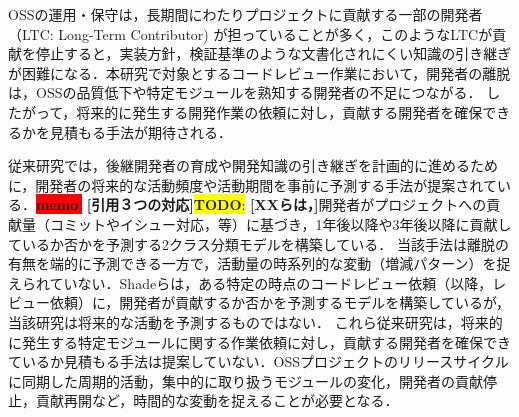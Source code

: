\documentclass[submit,noauthor,ses,dvipdfmx]{ipsj}
\newcommand{\todo}[1]{\colorbox{yellow}{{\bf TODO}:}{\color{red} {\textbf{[#1]}}}}
\newcommand{\memo}[1]{\colorbox{red}{{\bf memo}:}{\color{blue} {\textbf{[#1]}}}}
\begin{document}
OSSの運用・保守は，長期間にわたりプロジェクトに貢献する一部の開発者（LTC: Long-Term Contributor) が担っていることが多く，このようなLTCが貢献を停止すると，実装方針，検証基準のような文書化されにくい知識の引き継ぎが困難になる．本研究で対象とするコードレビュー作業において，開発者の離脱は，OSSの品質低下や特定モジュールを熟知する開発者の不足につながる\cite{bacchelli}\cite{mcintosh}．
したがって，将来的に発生する開発作業の依頼に対し，貢献する開発者を確保できるかを見積もる手法が期待される．

従来研究では，後継開発者の育成や開発知識の引き継ぎを計画的に進めるために，開発者の将来的な活動頻度や活動期間を事前に予測する手法が提案されている．\memo{引用３つの対応}\todo{XXらは，}開発者がプロジェクトへの貢献量（コミットやイシュー対応，等）に基づき，1年後以降や3年後以降に貢献しているか否かを予測する2クラス分類モデルを構築している\cite{zhou}\cite{bao}\cite{constantinou}．
当該手法は離脱の有無を端的に予測できる一方で，活動量の時系列的な変動（増減パターン）を捉えられていない．Shadeらは，ある特定の時点のコードレビュー依頼（以降，レビュー依頼）に，開発者が貢献するか否かを予測するモデルを構築しているが，当該研究は将来的な活動を予測するものではない．
これら従来研究は，将来的に発生する特定モジュールに関する作業依頼に対し，貢献する開発者を確保できているか見積もる手法は提案していない．OSSプロジェクトのリリースサイクルに同期した周期的活動，集中的に取り扱うモジュールの変化，開発者の貢献停止，貢献再開など，時間的な変動を捉えることが必要となる．


\end{document}

